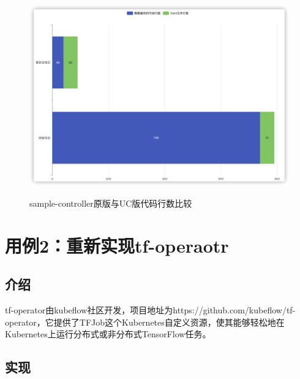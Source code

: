 \documentclass[macfonts,master]{njuthesis}
\begin{document}
\begin{figure}[htbp]
  \centering
  \includegraphics[width= 1\textwidth]{pics/sample-controller-cl.png}\\
  \caption{sample-controller原版与UC版代码行数比较}\label{fig:sample-controller-cl}
\end{figure}

\section{用例2：重新实现tf-operaotr}
\subsection{介绍}
tf-operator由kubeflow社区开发，项目地址为https://github.com/kubeflow/tf-operator，它提供了TFJob这个Kubernetes自定义资源，使其能够轻松地在Kubernetes上运行分布式或非分布式TensorFlow任务。
\subsection{实现}
\end{document}
